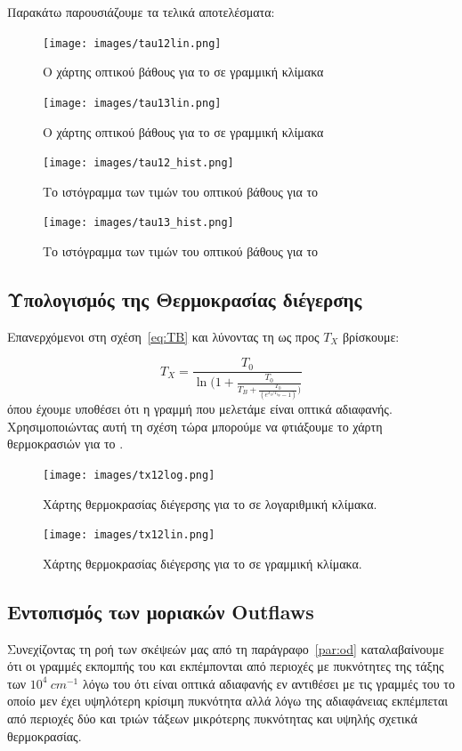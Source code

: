 \documentclass[a4paper,12pt]{memoir}
\begin{document}
Παρακάτω παρουσιάζουμε τα τελικά αποτελέσματα:

\begin{figure}[h!]
\centering
	\texttt{[image: images/tau12lin.png]}
	\caption{Ο χάρτης οπτικού βάθους για το  σε γραμμική κλίμακα}
\end{figure}

\begin{figure}[h!]
\centering
	\texttt{[image: images/tau13lin.png]}
	\caption{Ο χάρτης οπτικού βάθους για το  σε γραμμική κλίμακα}
\end{figure}

\begin{figure}[h!]
	\centering
	\texttt{[image: images/tau12\_hist.png]}
	\caption{Το ιστόγραμμα των τιμών του οπτικού βάθους για το }
	
	
	\centering
	\texttt{[image: images/tau13\_hist.png]}
	\caption{Το ιστόγραμμα των τιμών του οπτικού βάθους για το }
\end{figure}

\subsection{Υπολογισμός της Θερμοκρασίας διέγερσης}

Επανερχόμενοι στη σχέση~\ref{eq:TB} και λύνοντας τη ως προς $T_X$ βρίσκουμε:

\begin{equation}
T_X=\frac{T_0}{\ln (1+\frac{T_0}{T_B+\frac{T_0}{( e^{T_0/T_{bg}}-1)})}}
\end{equation}
όπου έχουμε υποθέσει ότι η γραμμή που μελετάμε είναι οπτικά αδιαφανής. Χρησιμοποιώντας αυτή τη σχέση τώρα μπορούμε να φτιάξουμε το χάρτη θερμοκρασιών για το . 

\begin{figure}[h!]
	\centering
	\texttt{[image: images/tx12log.png]}
	\caption{Χάρτης θερμοκρασίας διέγερσης για το  σε λογαριθμική κλίμακα.}
	
	
	\centering
	\texttt{[image: images/tx12lin.png]}
	\caption{Χάρτης θερμοκρασίας διέγερσης για το  σε γραμμική κλίμακα.}
\end{figure}

\subsection{Εντοπισμός των μοριακών Outflaws}
Συνεχίζοντας τη ροή των σκέψεών μας από τη παράγραφο~\ref{par:od} καταλαβαίνουμε ότι οι γραμμές εκπομπής του  και  εκπέμπονται από περιοχές με πυκνότητες της τάξης των $10^4\ cm^{-1}$ λόγω του ότι είναι οπτικά αδιαφανής εν αντιθέσει με τις γραμμές του  το οποίο μεν έχει υψηλότερη κρίσιμη πυκνότητα αλλά λόγω της αδιαφάνειας εκπέμπεται από περιοχές δύο και τριών τάξεων μικρότερης πυκνότητας και υψηλής σχετικά θερμοκρασίας.
\end{document}

